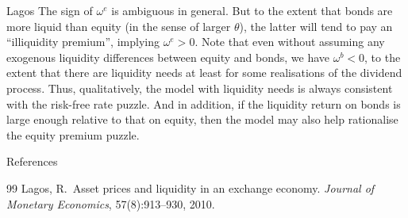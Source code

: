 \documentclass[aspectratio=169,xcolor=dvipsnames]{beamer}
\begin{document}
\begin{frame}{Lagos}
    The sign of $\omega^e$ is ambiguous in general. But to the extent that bonds are more liquid than equity (in the sense of larger $\theta$), the latter will tend to pay an ``illiquidity premium'', implying $\omega^e > 0$. Note that even without assuming any exogenous liquidity differences between equity and bonds, we have $\omega^b < 0$, to the extent that there are liquidity needs at least for some realisations of the dividend process. Thus, qualitatively, the model with liquidity needs is always consistent with the risk-free rate puzzle. And in addition, if the liquidity return on bonds is large enough relative to that on equity, then the model may also help rationalise the equity premium puzzle.
\end{frame}

\begin{frame}[allowframebreaks]{References}
    \small
    \begin{thebibliography}{99}
            Lagos, R.\ Asset prices and liquidity in an exchange economy. \textit{Journal of Monetary Economics}, 57(8):913--930, 2010.
    \end{thebibliography}
\end{frame}
\end{document}
